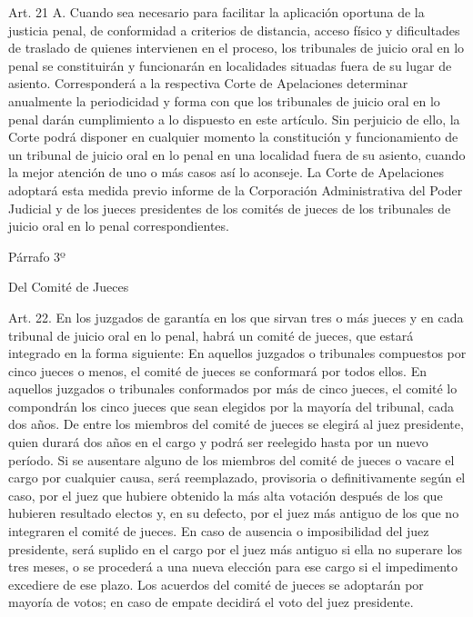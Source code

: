     Art. 21 A. Cuando sea necesario para facilitar la aplicación oportuna de la justicia penal, de conformidad a criterios de distancia, acceso físico y dificultades de traslado de quienes intervienen en el proceso, los tribunales de juicio oral en lo penal se constituirán y funcionarán en localidades situadas fuera de su lugar de asiento.
    Corresponderá a la respectiva Corte de Apelaciones determinar anualmente la periodicidad y forma con que los tribunales de juicio oral en lo penal darán cumplimiento a lo dispuesto en este artículo. Sin perjuicio de ello, la Corte podrá disponer en cualquier momento la constitución y funcionamiento de un tribunal de juicio oral en lo penal en una localidad fuera de su asiento, cuando la mejor atención de uno o más casos así lo aconseje.
    La Corte de Apelaciones adoptará esta medida previo informe de la Corporación Administrativa del Poder Judicial y de los jueces presidentes de los comités de jueces de los tribunales de juicio oral en lo penal correspondientes.

    Párrafo 3º

    Del Comité de Jueces

    Art. 22. En los juzgados de garantía en los que sirvan tres o más jueces y en cada tribunal de juicio oral en lo penal, habrá un comité de jueces, que estará integrado en la forma siguiente:
    En aquellos juzgados o tribunales compuestos por cinco jueces o menos, el comité de jueces se conformará por todos ellos.
    En aquellos juzgados o tribunales conformados por más de cinco jueces, el comité lo compondrán los cinco jueces que sean elegidos por la mayoría del tribunal, cada dos años.
    De entre los miembros del comité de jueces se elegirá al juez presidente, quien durará dos años en el cargo y podrá ser reelegido hasta por un nuevo período.
    Si se ausentare alguno de los miembros del comité de jueces o vacare el cargo por cualquier causa, será reemplazado, provisoria o definitivamente según el caso, por el juez que hubiere obtenido la más alta votación después de los que hubieren resultado electos y, en su defecto, por el juez más antiguo de los que no integraren el comité de jueces. En caso de ausencia o imposibilidad del juez presidente, será suplido en el cargo por el juez más antiguo si ella no superare los tres meses, o se procederá a una nueva elección para ese cargo si el impedimento excediere de ese plazo.
    Los acuerdos del comité de jueces se adoptarán por mayoría de votos; en caso de empate decidirá el voto del juez presidente.


